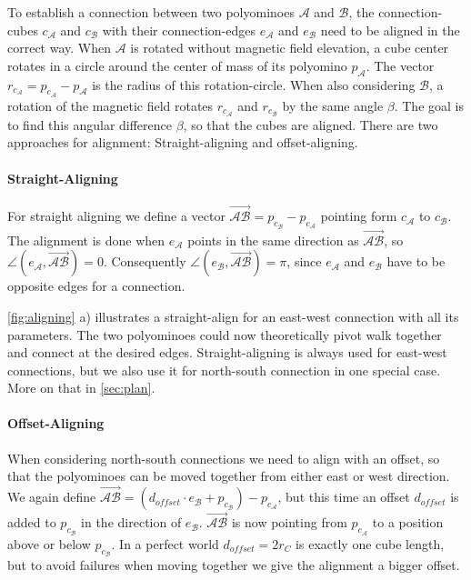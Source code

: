 To establish a connection between two polyominoes $\mathcal{A}$ and $\mathcal{B}$, the connection-cubes $c_\mathcal{A}$ and $c_\mathcal{B}$ with their connection-edges $e_\mathcal{A}$ and $e_\mathcal{B}$ need to be aligned in the correct way.
When $\mathcal{A}$ is rotated without magnetic field elevation, a cube center rotates in a circle around the center of mass of its polyomino $p_\mathcal{A}$.
The vector $r_{c_\mathcal{A}} = p_{c_\mathcal{A}} - p_\mathcal{A}$ is the radius of this rotation-circle.
When also considering $\mathcal{B}$, a rotation of the magnetic field rotates $r_{c_\mathcal{A}}$ and $r_{c_\mathcal{B}}$ by the same angle $\beta$.
The goal is to find this angular difference $\beta$, so that the cubes are aligned.
There are two approaches for alignment: Straight-aligning and offset-aligning.

\paragraph{Straight-Aligning}

For straight aligning we define a vector $\overrightarrow{\mathcal{A}\mathcal{B}} = p_{c_\mathcal{B}} - p_{c_\mathcal{A}}$ pointing form $c_\mathcal{A}$ to $c_\mathcal{B}$.
The alignment is done when $e_\mathcal{A}$ points in the same direction as $\overrightarrow{\mathcal{A}\mathcal{B}}$, so $\angle \left( e_\mathcal{A}, \overrightarrow{\mathcal{A}\mathcal{B}} \right) = 0$.
Consequently $\angle \left( e_\mathcal{B}, \overrightarrow{\mathcal{A}\mathcal{B}} \right) = \pi$, since $e_\mathcal{A}$ and $e_\mathcal{B}$ have to be opposite edges for a connection.

\autoref{fig:aligning} a) illustrates a straight-align for an east-west connection with all its parameters.
The two polyominoes could now theoretically pivot walk together and connect at the desired edges.
Straight-aligning is always used for east-west connections, but we also use it for north-south connection in one special case. More on that in \autoref{sec:plan}.

\paragraph{Offset-Aligning}

When considering north-south connections we need to align with an offset, so that the polyominoes can be moved together from either east or west direction.
We again define $\overrightarrow{\mathcal{A}\mathcal{B}} = \left( d_\textit{offset} \cdot e_\mathcal{B} + p_{c_\mathcal{B}} \right) - p_{c_\mathcal{A}}$, but this time an offset $d_\textit{offset}$ is added to $p_{c_\mathcal{B}}$ in the direction of $e_\mathcal{B}$.
$\overrightarrow{\mathcal{A}\mathcal{B}}$ is now pointing from $p_{c_\mathcal{A}}$ to a position above or below $p_{c_\mathcal{B}}$.
In a perfect world $d_\textit{offset} = 2 r_C$ is exactly one cube length, but to avoid failures when moving together we give the alignment a bigger offset.

